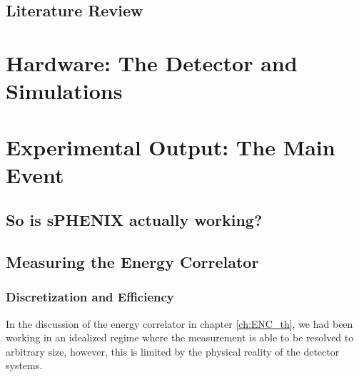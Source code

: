\documentclass[letterpaper, 12pt, oneside]{book}
\theoremstyle{definition}
\begin{document}
\frontmatter

\setcounter{page}{2}





\tableofcontents
\listoftables
\listoffigures

\mainmatter
\chapter{Literature Review}
\label{ch:LR}
 
\part{Hardware: The Detector and Simulations}

\part{Experimental Output: The Main Event}
\chapter{So is sPHENIX actually working?}

\chapter{Measuring the Energy Correlator}
	\section{Discretization and Efficiency}
	
	In the discussion of the energy correlator in chapter \ref{ch:ENC_th}, we had been working in an idealized regime where the measurement is able to be resolved to arbitrary size, however, this is limited by the physical reality of the detector systems.
\end{document}
